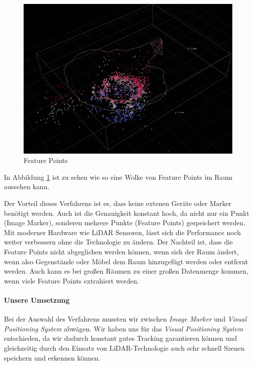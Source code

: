 \documentclass[titlepage, a4paper, 11pt]{scrartcl}
\begin{document}
  \begin{figure}[h]
    \centering
    \includegraphics[width=.5\textwidth]{arworldmap-featurepoints}
    \caption{Feature Points}
    \label{FeaturePoints}
  \end{figure}

  In Abbildung \ref{FeaturePoints} ist zu sehen wie so eine Wolke von Feature Points im Raum aussehen kann.

  Der Vorteil dieses Verfahrens ist es, dass keine extenen Geräte oder Marker benötigt werden. Auch ist die Genauigkeit konstant hoch, da nicht nur ein Punkt (Image Marker), sonderen mehrere Punkte (Feature Points) gespeichert werden. Mit moderner Hardware wie LiDAR Sensoren, lässt sich die Performance noch weiter verbessern ohne die Technologie zu ändern.
  Der Nachteil ist, dass die Feature Points nicht abgeglichen werden können, wenn sich der Raum ändert, wenn also Gegenstände oder Möbel dem Raum hinzugefügt werden oder entfernt werden.
  Auch kann es bei großen Räumen zu einer großen Datenmenge kommen, wenn viele Feature Points extrahiert werden.

  \paragraph{Unsere Umsetzung}

  Bei der Auswahl des Verfahrens mussten wir zwischen \textit{Image Marker} und \textit{Visual Positioning System} abwägen.
  Wir haben uns für das \textit{Visual Positioning System} entschieden, da wir dadurch konstant gutes Tracking garantieren können und
  gleichzeitig durch den Einsatz von LiDAR-Technologie auch sehr schnell Szenen speichern und erkennen können.
\end{document}
